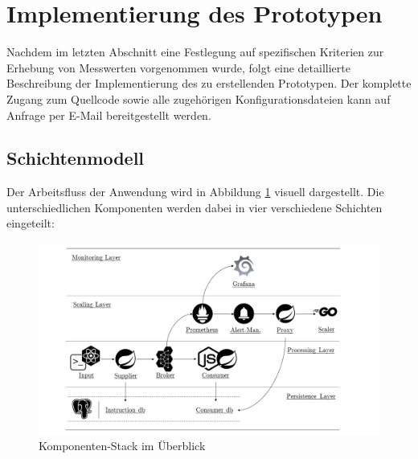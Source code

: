 \section{Implementierung des Prototypen}
\label{sec:implementierung}

Nachdem im letzten Abschnitt eine Festlegung auf spezifischen Kriterien zur Erhebung von Messwerten vorgenommen wurde, folgt eine detaillierte Beschreibung der Implementierung des zu erstellenden Prototypen. Der komplette Zugang zum  Quellcode sowie alle zugehörigen Konfigurationsdateien kann auf Anfrage per E-Mail bereitgestellt werden.

\subsection{Schichtenmodell}
\label{ss:schichtenmodell}
Der Arbeitsfluss der Anwendung wird in Abbildung \ref{fig:stackOverview} visuell dargestellt. Die unterschiedlichen Komponenten werden dabei in vier verschiedene Schichten eingeteilt: 

\begin{figure}[ht!]
	\centering
	\includegraphics[width=\linewidth]{kapitel/problemloesung/implementierung/_img/overview-bw}
	\caption[Komponenten-Stack im Überblick]{Komponenten-Stack im Überblick}
	\label{fig:stackOverview}
\end{figure}

